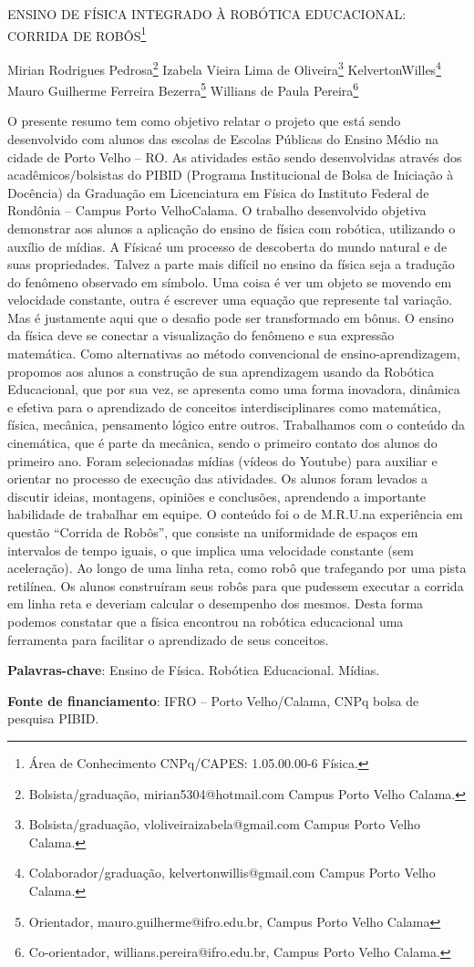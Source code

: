 \documentclass[article,12pt,onesidea,4paper,english,brazil]{abntex2}
\begin{document}
	
	
	\frenchspacing 
	
	\begin{center}
		\LARGE ENSINO DE FÍSICA INTEGRADO À ROBÓTICA EDUCACIONAL: CORRIDA DE ROBÔS\footnote{Área de Conhecimento CNPq/CAPES: 1.05.00.00-6 Física.}
		
		\normalsize
		Mirian Rodrigues Pedrosa\footnote{Bolsista/graduação, mirian5304@hotmail.com Campus Porto Velho Calama.} 
		Izabela Vieira Lima de Oliveira\footnote{Bolsista/graduação, vloliveiraizabela@gmail.com Campus Porto Velho Calama.} 
		KelvertonWilles\footnote{Colaborador/graduação, kelvertonwillis@gmail.com Campus Porto Velho Calama.} 
		Mauro Guilherme Ferreira Bezerra\footnote{Orientador, mauro.guilherme@ifro.edu.br, Campus Porto Velho Calama} 
		Willians de Paula Pereira\footnote{Co-orientador, willians.pereira@ifro.edu.br, Campus Porto Velho Calama.}
	\end{center}
	
	\noindent O presente resumo tem como objetivo relatar o projeto que está sendo desenvolvido com alunos das escolas de Escolas Públicas do Ensino Médio na cidade de Porto Velho – RO.  As atividades estão sendo desenvolvidas através dos acadêmicos/bolsistas do PIBID (Programa Institucional de Bolsa de Iniciação à Docência) da Graduação em Licenciatura em Física do Instituto Federal de Rondônia – Campus Porto VelhoCalama. O trabalho desenvolvido objetiva demonstrar aos alunos a aplicação do ensino de física com robótica, utilizando o auxílio de mídias. A Físicaé um processo de descoberta do mundo natural e de suas propriedades. Talvez a parte mais difícil no ensino da física seja a tradução do fenômeno observado em símbolo. Uma coisa é ver um objeto se movendo em velocidade constante, outra é escrever uma equação que represente tal variação. Mas é justamente aqui que o desafio pode ser transformado em bônus. O ensino da física deve se conectar a visualização do fenômeno e sua expressão matemática. Como alternativas ao método convencional de ensino-aprendizagem, propomos aos alunos a construção de sua aprendizagem usando da Robótica Educacional, que por sua vez, se apresenta como uma forma inovadora, dinâmica e efetiva para o aprendizado de conceitos interdisciplinares como matemática, física, mecânica, pensamento lógico entre outros. Trabalhamos com o conteúdo da cinemática, que é parte da mecânica, sendo o primeiro contato dos alunos do primeiro ano. Foram selecionadas mídias (vídeos do Youtube) para auxiliar e orientar no processo de execução das atividades. Os alunos foram levados a discutir ideias, montagens, opiniões e conclusões, aprendendo a importante habilidade de trabalhar em equipe. O conteúdo foi o de M.R.U.na experiência em questão “Corrida de Robôs”, que consiste na uniformidade de espaços em intervalos de tempo iguais, o que implica uma velocidade constante (sem aceleração). Ao longo de uma linha reta, como robô que trafegando por uma pista retilínea. Os alunos construíram seus robôs para que pudessem executar a corrida em linha reta e deveriam calcular o desempenho dos mesmos. Desta forma podemos constatar que a física encontrou na robótica educacional uma ferramenta para facilitar o aprendizado de seus conceitos.
	
	\vspace{\onelineskip}
	
	\noindent
	\textbf{Palavras-chave}: Ensino de Física. Robótica Educacional. Mídias.
	
	\noindent
    \textbf{Fonte de financiamento}: IFRO – Porto Velho/Calama, CNPq bolsa de pesquisa PIBID.
	
\end{document}
